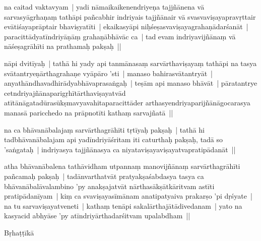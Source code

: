 \documentclass[article,12pt,a4paper]{memoir}%
\newcounter{parCount}
\begin{document}
	  
	  

	  
	  \pstart \leavevmode%
	\label{thakur75-8.13}na caitad vaktavyam | yadi nāmaikaikenendriyeṇa tajjñānena vā sarvasyāgrhaṇaṃ tathāpi pañcabhir indriyais tajjñānair vā svasvaviṣayapravṛttair evātiśayaprāptair bhaviṣyatīti | ekaikasyāpi niḥśeṣasvaviṣayagrahaṇādarśanāt | paracittādyatīndriyāṇāṃ grahaṇābhāvāc ca | tad evam indriyavijñānaṃ vā nāśeṣagrāhīti na prathamaḥ pakṣaḥ || 
	{}
	\pend%
      

	  
	  \pstart \leavevmode%
	\label{thakur75-8.17}nāpi dvitīyaḥ | tathā hi yady api tanmānasaṃ sarvārthaviṣayaṃ tathāpi na tasya svātantryeṇārthagrahaṇe vyāpāro 'sti | manaso bahirasvātantryāt | anyathāndhavadhirādyabhāvaprasaṅgaḥ | teṣām api manaso bhāvāt | pāratantrye cetndriyajñānaparigṛhītārthaviṣayatvād atītānāgatadūrasūkṣmavyavahitaparacittāder arthasyendriyaparijñānāgocarasya manasā paricchedo na prāpnotīti kathaṃ sarvajñatā || 
	{}
	\pend%
      

	  
	  \pstart \leavevmode%
	\label{thakur75-8.22}na ca bhāvanābalajaṃ sarvārthagrāhīti tṛtīyaḥ pakṣaḥ | tathā hi tadbhāvanābalajam api yadīndriyāśritam iti caturthaḥ pakṣaḥ, tadā so 'saṅgataḥ | indriyasya tajjñānasya ca niyataviṣayaviṣayatvapratipādanāt || 
	{}
	\pend%
      

	  
	  \pstart \leavevmode%
	\label{thakur75-8.25}atha bhāvanābalena tathāvidham utpannaṃ manovijñānaṃ sarvārthagrāhīti pañcamaḥ pakṣaḥ | tadānvarthatvāt pratyakṣaśabdasya tasya ca bhāvanābalāvalambino 'py anakṣajatvāt nārthasākṣātkāritvam astīti pratipādanīyam | kiṃ ca svaviṣayasīmānam anatipatyaiva prakarṣo 'pi dṛśyate | na tu sarvaviṣayatveneti | kathaṃ tenāpi sakalārthajātādivedanam | yato na kasyacid abhyāse 'py atīndriyārthadarśitvam upalabdham || 
	{}
	\pend%
      

	  
	  \pstart \leavevmode%
	\label{thakur75-8.30}Bṛhaṭṭīkā 
	{}
	\pend%
      
\end{document}
